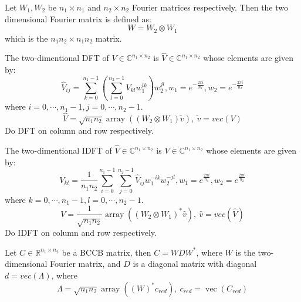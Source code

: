 \begin{theorem}
\begin{definition}
    Let $W_1, W_2$ be $n_1\times n_1$ and $n_2\times n_2$ Fourier matrices respectively. 
    Then the two dimensional Fourier matrix is defined as:
    \begin{equation}
        W = W_2\otimes W_1
    \end{equation}
    which is the $n_1n_2\times n_1n_2$ matrix.
\end{definition}

\begin{theorem}
    The two-dimentional DFT of $V\in \mathbb{C}^{n_1\times n_2}$ is $\hat{V}\in \mathbb{C}^{n_1\times n_2}$ whose elements are given by:
    \begin{equation}
        \hat{V}_{ij} = \sum_{k=0}^{n_1-1}\left(\sum_{l=0}^{n_2-1}V_{kl}w_1^{ik}\right)w_2^{jl}, w_1 = e^{-\frac{2\pi i}{n_1}}, w_2 = e^{-\frac{2\pi i}{n_2}}
    \end{equation}
    where $i = 0, \cdots, n_1 - 1, j = 0, \cdots, n_2-1$. 
    \begin{equation}
        \hat{V} = \sqrt{n_1n_2}\operatorname{array}\left((W_2\otimes W_1)\tilde{v}\right),\ \tilde{v} = vec(V)
    \end{equation}
    Do DFT on column and row respectively.
\end{theorem}

\begin{theorem}
    The two-dimentional IDFT of $\hat{V}\in \mathbb{C}^{n_1\times n_2}$ is $V\in \mathbb{C}^{n_1\times n_2}$ whose elements are given by:
    \begin{equation}
        V_{kl} = \frac{1}{n_1n_2}\sum_{i=0}^{n_1-1}\sum_{j=0}^{n_2-1}\hat{V}_{ij}w_1^{-ik}w_2^{-jl}, w_1 = e^{\frac{2\pi i}{n_1}}, w_2 = e^{\frac{2\pi i}{n_2}}
    \end{equation}
    where $k = 0, \cdots, n_1-1, l = 0, \cdots, n_2-1$. 
    \begin{equation}
        V = \frac{1}{\sqrt{n_1n_2}}\operatorname{array}\left((W_2\otimes W_1)^*\hat{v}\right),\ \hat{v} = vec(\hat{V})
    \end{equation}
    Do IDFT on column and row respectively.
\end{theorem}

\begin{theorem}
    Let $C\in \mathbb{R}^{n_1\times n_2}$ be a BCCB matrix, then $C = WDW^*$, where $W$ is the two-dimensional Fourier matrix, 
    and $D$ is a diagonal matrix with diagonal $d = vec(\Lambda)$, where
    \begin{equation}
        \Lambda = \sqrt{n_1n_2}\operatorname{array}\left((W)^*c_{red}\right),\ c_{red}=\operatorname{vec}(C_{red})
    \end{equation}
    

\end{theorem}
\end{theorem}
